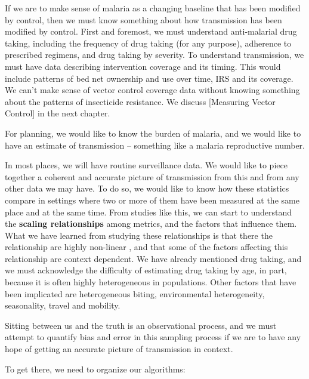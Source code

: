 \documentclass[
]{book}
\begin{document}
If we are to make sense of malaria as a changing baseline that has been modified by control, then we must know something about how transmission has been modified by control. First and foremost, we must understand anti-malarial drug taking, including the frequency of drug taking (for any purpose), adherence to prescribed regimens, and drug taking by severity. To understand transmission, we must have data describing intervention coverage and its timing. This would include patterns of bed net ownership and use over time, IRS and its coverage. We can't make sense of vector control coverage data without knowing something about the patterns of insecticide resistance. We discuss {[}Measuring Vector Control{]} in the next chapter.

For planning, we would like to know the burden of malaria, and we would like to have an estimate of transmission -- something like a malaria reproductive number.

In most places, we will have routine surveillance data. We would like to piece together a coherent and accurate picture of transmission from this and from any other data we may have. To do so, we would like to know how these statistics compare in settings where two or more of them have been measured at the same place and at the same time. From studies like this, we can start to understand the \textbf{scaling relationships} among metrics, and the factors that influence them. What we have learned from studying these relationships is that there the relationship are highly non-linear \autocite{HaySI2008MeasuringMalaria}, and that some of the factors affecting this relationship are context dependent. We have already mentioned drug taking, and we must acknowledge the difficulty of estimating drug taking by age, in part, because it is often highly heterogeneous in populations. Other factors that have been implicated are heterogeneous biting, environmental heterogeneity, seasonality, travel and mobility.

Sitting between us and the truth is an observational process, and we must attempt to quantify bias and error in this sampling process if we are to have any hope of getting an accurate picture of transmission in context.

To get there, we need to organize our algorithms:
\end{document}
